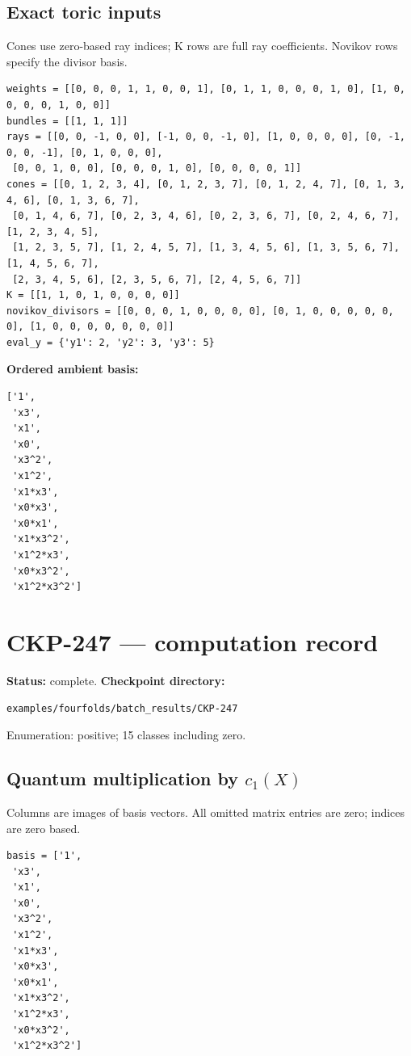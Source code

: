 \documentclass[10pt,a4paper]{article}
\begin{document}
\subsection*{Exact toric inputs}
Cones use zero-based ray indices; K rows are full ray coefficients. Novikov rows specify the divisor basis.

\begin{lstlisting}
weights = [[0, 0, 0, 1, 1, 0, 0, 1], [0, 1, 1, 0, 0, 0, 1, 0], [1, 0, 0, 0, 0, 1, 0, 0]]
bundles = [[1, 1, 1]]
rays = [[0, 0, -1, 0, 0], [-1, 0, 0, -1, 0], [1, 0, 0, 0, 0], [0, -1, 0, 0, -1], [0, 1, 0, 0, 0],
 [0, 0, 1, 0, 0], [0, 0, 0, 1, 0], [0, 0, 0, 0, 1]]
cones = [[0, 1, 2, 3, 4], [0, 1, 2, 3, 7], [0, 1, 2, 4, 7], [0, 1, 3, 4, 6], [0, 1, 3, 6, 7],
 [0, 1, 4, 6, 7], [0, 2, 3, 4, 6], [0, 2, 3, 6, 7], [0, 2, 4, 6, 7], [1, 2, 3, 4, 5],
 [1, 2, 3, 5, 7], [1, 2, 4, 5, 7], [1, 3, 4, 5, 6], [1, 3, 5, 6, 7], [1, 4, 5, 6, 7],
 [2, 3, 4, 5, 6], [2, 3, 5, 6, 7], [2, 4, 5, 6, 7]]
K = [[1, 1, 0, 1, 0, 0, 0, 0]]
novikov_divisors = [[0, 0, 0, 1, 0, 0, 0, 0], [0, 1, 0, 0, 0, 0, 0, 0], [1, 0, 0, 0, 0, 0, 0, 0]]
eval_y = {'y1': 2, 'y2': 3, 'y3': 5}
\end{lstlisting}

\textbf{Ordered ambient basis:}
\begin{lstlisting}
['1',
 'x3',
 'x1',
 'x0',
 'x3^2',
 'x1^2',
 'x1*x3',
 'x0*x3',
 'x0*x1',
 'x1*x3^2',
 'x1^2*x3',
 'x0*x3^2',
 'x1^2*x3^2']
\end{lstlisting}

\clearpage\section*{CKP-247 --- computation record}
\textbf{Status:} complete.
\textbf{Checkpoint directory:}
\begin{lstlisting}
examples/fourfolds/batch_results/CKP-247
\end{lstlisting}

Enumeration: positive; 15 classes including zero.
\subsection*{Quantum multiplication by $c_1(X)$}
Columns are images of basis vectors. All omitted matrix entries are zero; indices are zero based.

\begin{lstlisting}
basis = ['1',
 'x3',
 'x1',
 'x0',
 'x3^2',
 'x1^2',
 'x1*x3',
 'x0*x3',
 'x0*x1',
 'x1*x3^2',
 'x1^2*x3',
 'x0*x3^2',
 'x1^2*x3^2']
\end{lstlisting}
\end{document}
